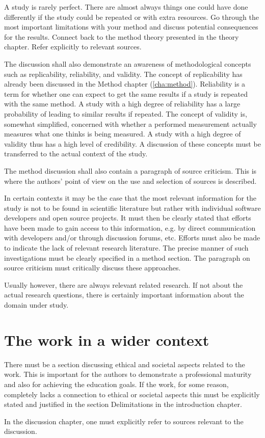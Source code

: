 A study is rarely perfect. There are almost always things one
could have done differently if the study could be repeated or
with extra resources. Go through the most important
limitations with your method and discuss potential
consequences for the results. Connect back to the method
theory presented in the theory chapter. Refer explicitly to
relevant sources.

The discussion shall also demonstrate an awareness of methodological
concepts such as replicability, reliability, and validity. The concept
of replicability has already been discussed in the Method chapter
(\ref{cha:method}). Reliability is a term for whether one can expect
to get the same results if a study is repeated with the same method. A
study with a high degree of reliability has a large probability of
leading to similar results if repeated. The concept of validity is,
somewhat simplified, concerned with whether a performed measurement
actually measures what one thinks is being measured. A study with a
high degree of validity thus has a high level of credibility. A
discussion of these concepts must be transferred to the actual context
of the study.

The method discussion shall also contain a paragraph of
source criticism. This is where the authors’ point of view on
the use and selection of sources is described.

In certain contexts it may be the case that the most relevant
information for the study is not to be found in scientific
literature but rather with individual software developers and
open source projects. It must then be clearly stated that
efforts have been made to gain access to this information,
e.g. by direct communication with developers and/or through
discussion forums, etc. Efforts must also be made to indicate
the lack of relevant research literature. The precise manner
of such investigations must be clearly specified in a method
section. The paragraph on source criticism must critically
discuss these approaches.

Usually however, there are always relevant related research.
If not about the actual research questions, there is certainly
important information about the domain under study.

\section{The work in a wider context}
\label{sec:work-wider-context}

There must be a section discussing ethical and societal
aspects related to the work. This is important for the authors
to demonstrate a professional maturity and also for achieving
the education goals. If the work, for some reason, completely
lacks a connection to ethical or societal aspects this must be
explicitly stated and justified in the section Delimitations in
the introduction chapter.

In the discussion chapter, one must explicitly refer to sources
relevant to the discussion.

